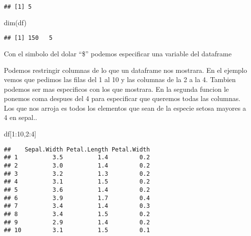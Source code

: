 \documentclass[
]{article}
\newenvironment{Shaded}{\begin{snugshade}}{\end{snugshade}}
\newcommand{\DecValTok}[1]{\textcolor[rgb]{0.00,0.00,0.81}{#1}}
\newcommand{\FunctionTok}[1]{\textcolor[rgb]{0.00,0.00,0.00}{#1}}
\newcommand{\NormalTok}[1]{#1}
\newcommand{\SpecialCharTok}[1]{\textcolor[rgb]{0.00,0.00,0.00}{#1}}
\newcommand{\StringTok}[1]{\textcolor[rgb]{0.31,0.60,0.02}{#1}}
\begin{document}
\begin{verbatim}
## [1] 5
\end{verbatim}

\begin{Shaded}
\begin{Highlighting}[]
\FunctionTok{dim}\NormalTok{(df)}
\end{Highlighting}
\end{Shaded}

\begin{verbatim}
## [1] 150   5
\end{verbatim}

Con el simbolo del dolar ``\$'' podemos especificar una variable del
dataframe

Podemos restringir columnas de lo que un dataframe nos mostrara. En el
ejemplo vemos que pedimos las filas del 1 al 10 y las columnas de la 2 a
la 4. Tambien podemos ser mas especificos con los que mostrara. En la
segunda funcion le ponemos coma despues del 4 para especificar que
queremos todas las columnas. Los que nos arroja es todos los elementos
que sean de la especie setosa mayores a 4 en sepal..

\begin{Shaded}
\begin{Highlighting}[]
\NormalTok{df[}\DecValTok{1}\SpecialCharTok{:}\DecValTok{10}\NormalTok{,}\DecValTok{2}\SpecialCharTok{:}\DecValTok{4}\NormalTok{]}
\end{Highlighting}
\end{Shaded}

\begin{verbatim}
##    Sepal.Width Petal.Length Petal.Width
## 1          3.5          1.4         0.2
## 2          3.0          1.4         0.2
## 3          3.2          1.3         0.2
## 4          3.1          1.5         0.2
## 5          3.6          1.4         0.2
## 6          3.9          1.7         0.4
## 7          3.4          1.4         0.3
## 8          3.4          1.5         0.2
## 9          2.9          1.4         0.2
## 10         3.1          1.5         0.1
\end{verbatim}

\begin{Shaded}
\end{Shaded}
\end{document}
